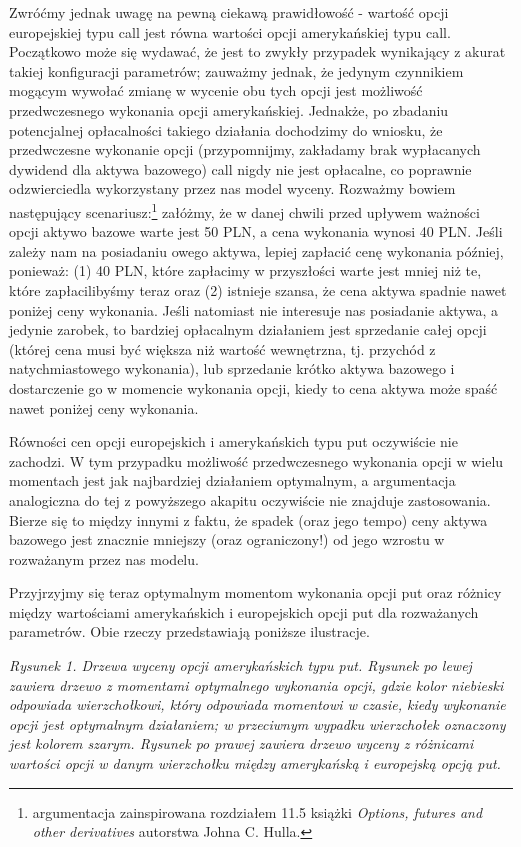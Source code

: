 \documentclass[
]{article}
\begin{document}
Zwróćmy jednak uwagę na pewną ciekawą prawidłowość - wartość opcji
europejskiej typu call jest równa wartości opcji amerykańskiej typu
call. Początkowo może się wydawać, że jest to zwykły przypadek
wynikający z akurat takiej konfiguracji parametrów; zauważmy jednak, że
jedynym czynnikiem mogącym wywołać zmianę w wycenie obu tych opcji jest
możliwość przedwczesnego wykonania opcji amerykańskiej. Jednakże, po
zbadaniu potencjalnej opłacalności takiego działania dochodzimy do
wniosku, że przedwczesne wykonanie opcji (przypomnijmy, zakładamy brak
wypłacanych dywidend dla aktywa bazowego) call nigdy nie jest opłacalne,
co poprawnie odzwierciedla wykorzystany przez nas model wyceny. Rozważmy
bowiem następujący scenariusz:\footnote{argumentacja zainspirowana
  rozdziałem 11.5 książki \emph{Options, futures and other derivatives}
  autorstwa Johna C. Hulla.} załóżmy, że w danej chwili przed upływem
ważności opcji aktywo bazowe warte jest 50 PLN, a cena wykonania wynosi
40 PLN. Jeśli zależy nam na posiadaniu owego aktywa, lepiej zapłacić
cenę wykonania później, ponieważ: (1) 40 PLN, które zapłacimy w
przyszłości warte jest mniej niż te, które zapłacilibyśmy teraz oraz (2)
istnieje szansa, że cena aktywa spadnie nawet poniżej ceny wykonania.
Jeśli natomiast nie interesuje nas posiadanie aktywa, a jedynie zarobek,
to bardziej opłacalnym działaniem jest sprzedanie całej opcji (której
cena musi być większa niż wartość wewnętrzna, tj. przychód z
natychmiastowego wykonania), lub sprzedanie krótko aktywa bazowego i
dostarczenie go w momencie wykonania opcji, kiedy to cena aktywa może
spaść nawet poniżej ceny wykonania.

Równości cen opcji europejskich i amerykańskich typu put oczywiście nie
zachodzi. W tym przypadku możliwość przedwczesnego wykonania opcji w
wielu momentach jest jak najbardziej działaniem optymalnym, a
argumentacja analogiczna do tej z powyższego akapitu oczywiście nie
znajduje zastosowania. Bierze się to między innymi z faktu, że spadek
(oraz jego tempo) ceny aktywa bazowego jest znacznie mniejszy (oraz
ograniczony!) od jego wzrostu w rozważanym przez nas modelu.

Przyjrzyjmy się teraz optymalnym momentom wykonania opcji put oraz
różnicy między wartościami amerykańskich i europejskich opcji put dla
rozważanych parametrów. Obie rzeczy przedstawiają poniższe ilustracje.

\emph{Rysunek 1. Drzewa wyceny opcji amerykańskich typu put. Rysunek po
lewej zawiera drzewo z momentami optymalnego wykonania opcji, gdzie
kolor niebieski odpowiada wierzchołkowi, który odpowiada momentowi w
czasie, kiedy wykonanie opcji jest optymalnym działaniem; w przeciwnym
wypadku wierzchołek oznaczony jest kolorem szarym. Rysunek po prawej
zawiera drzewo wyceny z różnicami wartości opcji w danym wierzchołku
między amerykańską i europejską opcją put.}
\end{document}
